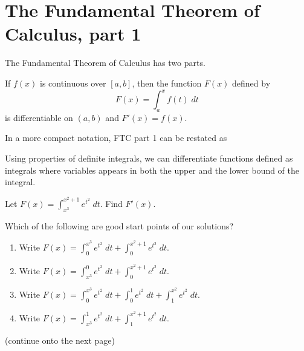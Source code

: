 \documentclass[../main.tex]{subfiles}
\begin{document}
 \section{The Fundamental Theorem of Calculus, part 1}
  The Fundamental Theorem of Calculus has two parts.

  \begin{mdframed}[style=withref-compact]
    If \(f(x)\) is continuous over \([a,b]\), then the function \(F(x)\) defined by
    \[
      F(x) = \int_{a}^{x} f(t) \;dt
    \]
    is differentiable on \((a,b)\) and \(F'(x) = f(x)\).

  \end{mdframed}

  In a more compact notation, FTC part 1 can be restated as 


  Using properties of definite integrals, we can differentiate functions defined as integrals where variables appears in both the upper and the lower bound of the integral.
  \begin{example} \label{ex:ftc-one}
    Let \(F(x) = \int_{x^{3}}^{x^{2} + 1} e^{t^{2}} \;dt\). Find \(F'(x)\).

    Which of the following are good start points of our solutions?
    \begin{enumerate}[label=(\alph*)]
      \item Write \(F(x) = \int_{0}^{x^{3}} e^{t^{2}} \;dt + \int_{0}^{x^{2}+1} e^{t^{2}} \;dt \).
      \item Write \(F(x) = \int_{x^{3}}^{0} e^{t^{2}} \;dt + \int_{0}^{x^{2}+1} e^{t^{2}} \;dt \).
      \item Write \(F(x) = \int_{0}^{x^{3}} e^{t^{2}} \;dt + \int_{0}^{1} e^{t^{2}} \;dt + \int_{1}^{x^{2}} e^{t^{2}} \;dt\).
      \item Write \(F(x) = \int_{x^{3}}^{1} e^{t^{2}} \;dt + \int_{1}^{x^{2}+1} e^{t^{2}} \;dt \).
    \end{enumerate}

    {\footnotesize (continue onto the next page)}

  \end{example}
\end{document}
